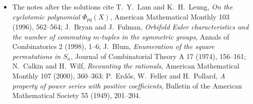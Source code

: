 \begin{itemize}
prints MacMahon's table of $p(n)$ up to $n=200$.
\item The notes after the solutions cite T.~Y.~Lam and K.~H.~Leung, \emph{On the cyclotomic polynomial $\Phi_{pq}(X)$}, American Mathematical Monthly 103 (1996),
562--564; J.~Bryan and J.~Fulman, \emph{Orbifold Euler characteristics and the number of commuting $m$-tuples in the symmetric groups}, Annals of Combinatorics 2
(1998), 1--6; J.~Blum, \emph{Enumeration of the square permutations in $S_n$}, Journal of Combinatorial Theory A 17 (1974), 156--161; N.~Calkin and H.~Wilf,
\emph{Recounting the rationals}, American Mathematical Monthly 107 (2000), 360--363; P.~Erd\H os, W.~Feller and H.~Pollard, \emph{A property of power series with
positive coefficients}, Bulletin of the American Mathematical Society 55 (1949), 201--204.
\end{itemize}
